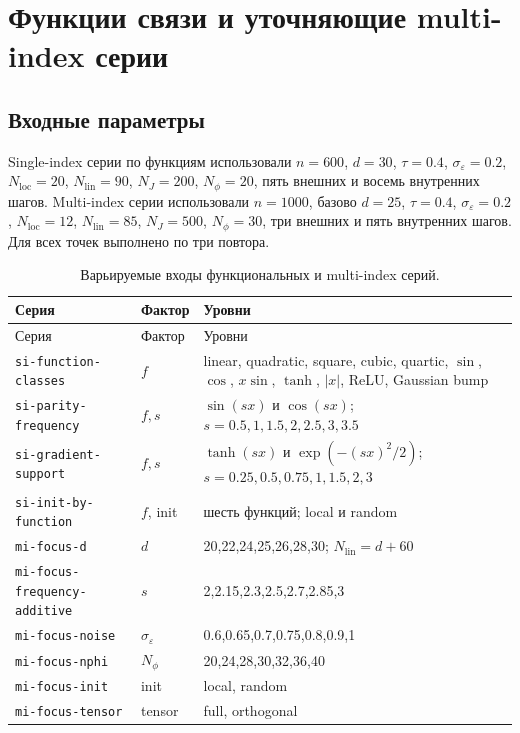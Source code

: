 \documentclass[11pt,a4paper]{article}
\newcommand{\code}[1]{\texttt{#1}}
\begin{document}
\section{Функции связи и уточняющие multi-index серии}

\subsection{Входные параметры}

Single-index серии по функциям использовали $n=600$, $d=30$, $\tau=0.4$,
$\sigma_\varepsilon=0.2$, $N_{\mathrm{loc}}=20$,
$N_{\mathrm{lin}}=90$, $N_J=200$, $N_\phi=20$, пять внешних и восемь
внутренних шагов. Multi-index серии использовали $n=1000$, базово $d=25$,
$\tau=0.4$, $\sigma_\varepsilon=0.2$, $N_{\mathrm{loc}}=12$,
$N_{\mathrm{lin}}=85$, $N_J=500$, $N_\phi=30$, три внешних и пять
внутренних шагов. Для всех точек выполнено по три повтора.

\begin{longtable}{p{}p{}p{}}
\caption{Варьируемые входы функциональных и multi-index серий.}
\label{tab:function-inputs}\\
\toprule
Серия & Фактор & Уровни \\
\midrule
\endfirsthead
\toprule
Серия & Фактор & Уровни \\
\midrule
\endhead
\code{si-function-classes} & $f$ & linear, quadratic, square, cubic, quartic, $\sin$, $\cos$, $x\sin$, $\tanh$, $|x|$, ReLU, Gaussian bump \\
\code{si-parity-frequency} & $f,s$ & $\sin(sx)$ и $\cos(sx)$; $s=0.5,1,1.5,2,2.5,3,3.5$ \\
\code{si-gradient-support} & $f,s$ & $\tanh(sx)$ и $\exp(-(sx)^2/2)$; $s=0.25,0.5,0.75,1,1.5,2,3$ \\
\code{si-init-by-function} & $f$, init & шесть функций; local и random \\
\code{mi-focus-d} & $d$ & 20,22,24,25,26,28,30; $N_{\mathrm{lin}}=d+60$ \\
\code{mi-focus-frequency-additive} & $s$ & 2,2.15,2.3,2.5,2.7,2.85,3 \\
\code{mi-focus-noise} & $\sigma_\varepsilon$ & 0.6,0.65,0.7,0.75,0.8,0.9,1 \\
\code{mi-focus-nphi} & $N_\phi$ & 20,24,28,30,32,36,40 \\
\code{mi-focus-init} & init & local, random \\
\code{mi-focus-tensor} & tensor & full, orthogonal \\
\bottomrule
\end{longtable}
\end{document}
